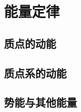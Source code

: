 

\section{能量定律}\label{3-4}

\subsection{质点的动能}\label{3-4-1}

\subsection{质点系的动能}\label{3-4-2}

\subsection{势能与其他能量}\label{3-4-3}